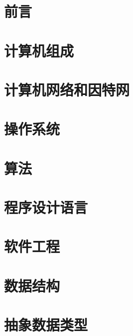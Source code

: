 \documentclass[a4pape]{book}
\begin{document}
\frontmatter
\tableofcontents

\mainmatter
\chapter{前言}

\chapter{计算机组成}

\chapter{计算机网络和因特网}

\chapter{操作系统}

\chapter{算法}

\chapter{程序设计语言}

\chapter{软件工程}

\chapter{数据结构}

\chapter{抽象数据类型}

\end{document}
